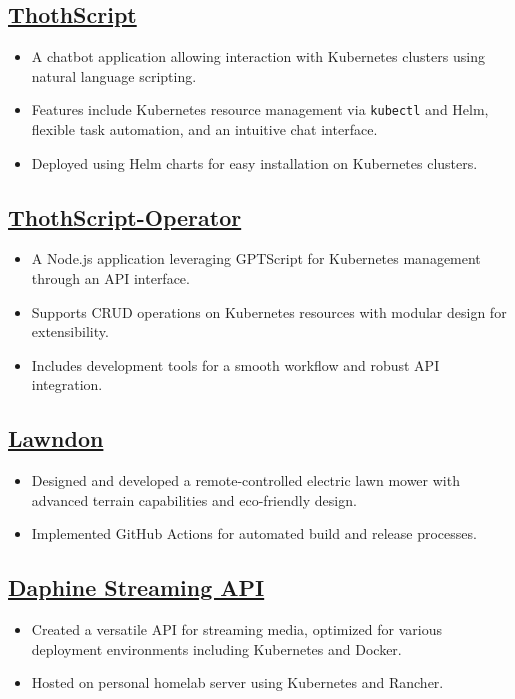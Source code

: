 \documentclass[a4paper,10pt]{article}
\begin{document}
\subsection*{\href{https://github.com/jordojordo/thothscript}{ThothScript}}
\begin{itemize}[leftmargin=1.5em]
    \item A chatbot application allowing interaction with Kubernetes clusters using natural language scripting.
    \item Features include Kubernetes resource management via \texttt{kubectl} and Helm, flexible task automation, and an intuitive chat interface.
    \item Deployed using Helm charts for easy installation on Kubernetes clusters.
\end{itemize}

\subsection*{\href{https://github.com/jordojordo/thothscript-operator}{ThothScript-Operator}}
\begin{itemize}[leftmargin=1.5em]
    \item A Node.js application leveraging GPTScript for Kubernetes management through an API interface.
    \item Supports CRUD operations on Kubernetes resources with modular design for extensibility.
    \item Includes development tools for a smooth workflow and robust API integration.
\end{itemize}

\subsection*{\href{https://github.com/jordojordo/lawndon-lite}{Lawndon}}
\begin{itemize}[leftmargin=1.5em]
    \item Designed and developed a remote-controlled electric lawn mower with advanced terrain capabilities and eco-friendly design.
    \item Implemented GitHub Actions for automated build and release processes.
\end{itemize}

\subsection*{\href{https://github.com/jordojordo/daphine}{Daphine Streaming API}}
\begin{itemize}[leftmargin=1.5em]
    \item Created a versatile API for streaming media, optimized for various deployment environments including Kubernetes and Docker.
    \item Hosted on personal homelab server using Kubernetes and Rancher.
\end{itemize}
\end{document}
